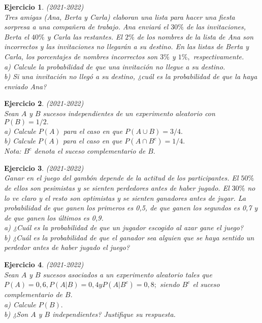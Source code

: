 \documentclass[12pt, a4paper]{amsart}
\newtheorem{ejer}{Ejercicio}
\begin{document}
\begin{ejer}\em (2021-2022)\\
Tres amigas (Ana, Berta y Carla) elaboran una lista para hacer una fiesta sorpresa a una compañera de trabajo. Ana enviará el $30\%$ de las invitaciones, Berta el $40\%$ y Carla las restantes. El $2\%$ de los nombres de la lista de Ana son incorrectos y las invitaciones no llegarán a su destino. En las listas de Berta y Carla, los porcentajes de nombres incorrectos son $3\%$ y $1\%,$ respectivamente.\\
a) Calcule la probabilidad de que una invitación no llegue a su destino.\\
b) Si una invitación no llegó a su destino, ¿cuál es la probabilidad de que la haya enviado Ana?
\end{ejer}

\begin{ejer}\em (2021-2022)\\
Sean $A$ y $B$ sucesos independientes de un experimento aleatorio con $P(B) = 1/2.$\\
a) Calcule $P(A)$ para el caso en que $P(A \cup B) = 3/4.$\\
b) Calcule $P(A)$ para el caso en que $P(A \cap B^c) = 1/4.$\\
Nota: $B^c$ denota el suceso complementario de $B.$
\end{ejer}

\begin{ejer}\em (2021-2022)\\
Ganar en el juego del gambón depende de la actitud de los participantes. El $50\%$ de ellos son pesimistas y se sienten perdedores antes de haber jugado. El $30\%$ no lo ve claro y el resto son optimistas y se sienten ganadores antes de jugar. La probabilidad de que ganen los primeros es 0,5, de que ganen los segundos es 0,7 y de que ganen los últimos es 0,9.\\
a) ¿Cuál es la probabilidad de que un jugador escogido al azar gane el juego?\\
b) ¿Cuál es la probabilidad de que el ganador sea alguien que se haya sentido un perdedor antes de haber jugado el juego?
\end{ejer}

\begin{ejer}\em (2021-2022)\\
Sean $A$ y $B$ sucesos asociados a un experimento aleatorio tales que $P (A) = 0,6, P (A|B) = 0,4 y P (A|B^c) = 0,8 ;$ siendo $B^c$ el suceso complementario de $B.$\\
a) Calcule $P(B).$\\
b) ¿Son $A$ y $B$ independientes? Justifique su respuesta.
\end{ejer}
\end{document}
